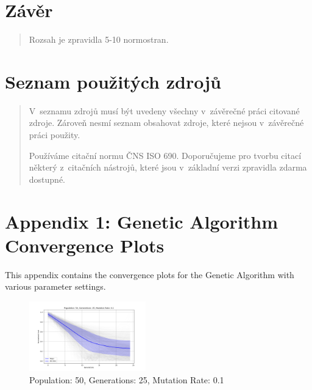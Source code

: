 \documentclass[
]{article}
\begin{document}
    \newpage
    \hypertarget{zuxe1vux11br}{%


        \section{Závěr}\label{zuxe1vux11br}}

    \begin{quote}
        Rozsah je zpravidla 5-10 normostran.
    \end{quote}

    \newpage
    \hypertarget{seznam-pouux17eituxfdch-zdrojux16f}{%
        \section{Seznam použitých
        zdrojů}\label{seznam-pouux17eituxfdch-zdrojux16f}}

    \begin{quote}
        V~seznamu zdrojů musí být uvedeny všechny v~závěrečné práci citované
        zdroje. Zároveň nesmí seznam obsahovat zdroje, které nejsou v~závěrečné
        práci použity.

        Používáme citační normu ČNS ISO 690. Doporučujeme pro tvorbu citací
        některý z~citačních nástrojů, které jsou v~základní verzi zpravidla
        zdarma dostupné.
    \end{quote}

    \newpage
    \appendix


    \section{Appendix 1: Genetic Algorithm Convergence Plots}

    This appendix contains the convergence plots for the Genetic Algorithm with various parameter settings.

    \begin{figure}[H]
        \centering
        \includegraphics[width=0.45\textwidth]{genetic_algorithm/appendix/Population_50_Generations_25_MutationRate_0.1}
        \caption{Population: 50, Generations: 25, Mutation Rate: 0.1}
        \label{fig:app_ga_50_25_1}
    \end{figure}
\end{document}
